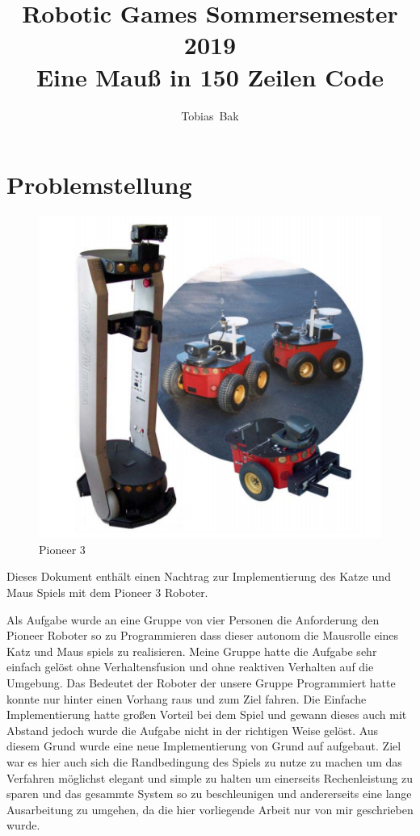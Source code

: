 \documentclass[11pt,a4paper]{article}
\title{Robotic Games Sommersemester 2019\\ Eine Mauß in 150 Zeilen Code}
\author{Tobias~Bak}
\begin{document}
\maketitle
\section{Problemstellung}
\begin{figure}
\centering
\includegraphics[scale=0.45]{media/titelbild.png}
\caption{Pioneer 3 \cite{pioneer} }
\end{figure}
Dieses Dokument enthält einen Nachtrag zur Implementierung des Katze und Maus Spiels mit dem Pioneer 3 Roboter.\cite{pioneer}

Als Aufgabe wurde an eine Gruppe von vier Personen die Anforderung den Pioneer Roboter so zu Programmieren dass dieser autonom die Mausrolle eines Katz und Maus spiels zu realisieren. Meine Gruppe hatte die Aufgabe sehr einfach gelöst ohne Verhaltensfusion und ohne reaktiven Verhalten auf die Umgebung. Das Bedeutet der Roboter der unsere Gruppe Programmiert hatte konnte nur hinter einen Vorhang raus und zum Ziel fahren. Die Einfache Implementierung hatte großen Vorteil bei dem Spiel und gewann dieses auch mit Abstand jedoch wurde die Aufgabe nicht in der richtigen Weise gelöst. Aus diesem Grund wurde eine neue Implementierung von Grund auf aufgebaut.
Ziel war es hier auch sich die Randbedingung des Spiels zu nutze zu machen um das Verfahren möglichst elegant und simple zu halten um einerseits Rechenleistung zu sparen und das gesammte System so zu beschleunigen und andererseits eine lange Ausarbeitung zu umgehen, da die hier vorliegende Arbeit nur von mir geschrieben wurde.
\end{document}
